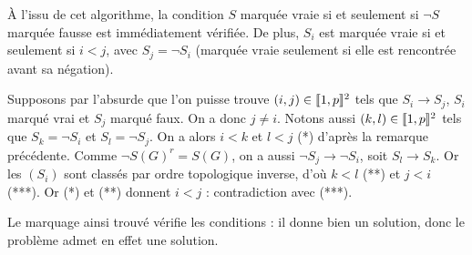 À l'issu de cet algorithme, la condition $S$ marquée vraie si et seulement si
$\neg S$ marquée fausse est immédiatement vérifiée. De plus, $S_i$ est marquée
vraie si et seulement si $i < j$, avec $S_j = \neg S_i$ (marquée vraie
seulement si elle est rencontrée avant sa négation).

Supposons par l'absurde que l'on puisse trouve $(i,j)\in\llbracket 1, p \rrbracket^2$ tels que
$S_i\rightarrow S_j$, $S_i$ marqué vrai et $S_j$ marqué faux. On a donc
$j \neq i$. Notons aussi $(k,l)\in\llbracket 1, p \rrbracket^2$ tels que $S_k = \neg S_i$ et
$S_l = \neg S_j$. On a alors $i < k$ et $l < j$ (*) d'après la remarque
précédente. Comme $\neg S(G)^r = S(G)$, on a aussi $\neg S_j\rightarrow \neg S_i$,
soit $S_l\rightarrow S_k$. Or les $(S_i)$ sont classés par ordre topologique
inverse, d'où $k < l$ (**) et $j < i$ (***). Or (*) et (**) donnent $i < j$ :
contradiction avec (***).

Le marquage ainsi trouvé vérifie les conditions : il donne bien un solution,
donc le problème admet en effet une solution.


